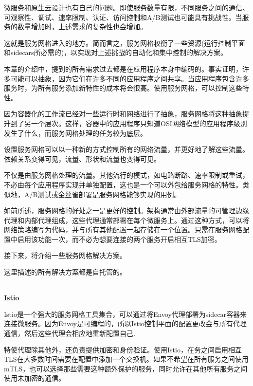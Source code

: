 
微服务和原生云设计也有自己的问题。即使服务数量有限，不同服务之间的通信、可观察性、调试、速率限制、认证、访问控制和A/B测试也可能具有挑战性。当服务的数量增加时，上述需求的复杂性也会增加。

这就是服务网格进入的地方。简而言之，服务网格权衡了一些资源(运行控制平面和sidecars所必需的)，以实现对上述挑战的自动化和集中控制的解决方案。


本章的介绍中，提到的所有需求过去都是在应用程序本身中编码的。事实证明，许多可能可以抽象，因为它们在许多不同的应用程序之间共享。当应用程序包含许多服务时，为所有服务添加新特性的成本将会很高。使用服务网格，可以控制这些特性。

因为容器化的工作流已经对一些运行时和网络进行了抽象，服务网格将这种抽象提升到了另一个层次。这样，容器中的应用程序只知道OSI网络模型的应用程序级别发生了什么，而服务网格处理的任务较为底层。

设置服务网格可以以一种新的方式控制所有的网络流量，并更好地了解这些流量。依赖关系变得可见，流量、形状和流量也变得可见。

不仅是由服务网格处理的流量。其他流行的模式，如电路断路、速率限制或重试，不必由每个应用程序实现并单独配置，这也是一个可以外包给服务网格的特性。类似地，A/B测试或金丝雀部署是服务网格能够实现的用例。

如前所述，服务网格的好处之一是更好的控制。架构通常由外部流量的可管理边缘代理和内部代理组成，这些代理通常部署在每个微服务上。通过这种方式，可以将网络策略编写为代码，并与所有其他配置一起存储在一个位置。只需在服务网格配置中启用该功能一次，而不必为想要连接的两个服务开启相互TLS加密。

接下来，将介绍一些服务网格解决方案。


这里描述的所有解决方案都是自托管的。

\hspace*{\fill} \\ %
\noindent
\textbf{Istio}

Istio是一个强大的服务网格工具集合，可以通过将Envoy代理部署为sidecar容器来连接微服务。因为Envoy是可编程的，所以Istio控制平面的配置更改会与所有代理通信，然后这些代理会相应地重新配置自己.

特使代理除其他外，还负责提供加密和身份验证。使用Istio，在务之间启用相互TLS在大多数时间需要在配置中添加一个交换机。如果不希望在所有服务之间使用mTLS，也可以选择那些需要这种额外保护的服务，同时允许在其他所有服务之间使用未加密的通信。

